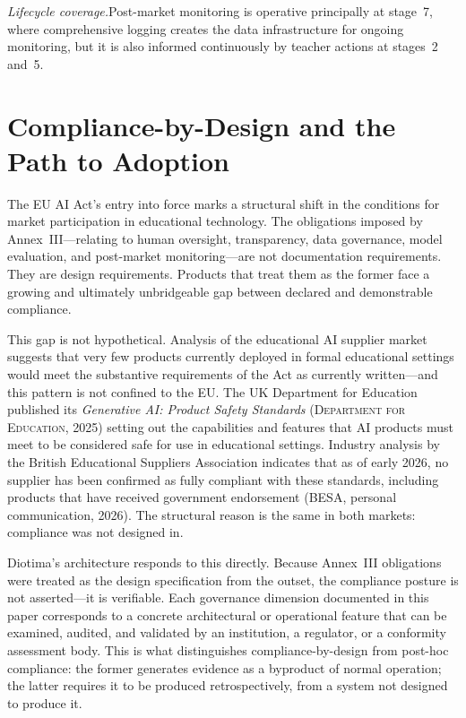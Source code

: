 \documentclass[10pt, a4paper, twocolumn]{article}
\begin{document}
\textit{Lifecycle coverage.}\quad Post-market monitoring is operative principally at
stage~7, where comprehensive logging creates the data infrastructure for ongoing
monitoring, but it is also informed continuously by teacher actions at stages~2 and~5.

\section{Compliance-by-Design and the Path to Adoption}

The EU AI Act's entry into force marks a structural shift in the conditions for market
participation in educational technology. The obligations imposed by Annex~III---relating
to human oversight, transparency, data governance, model evaluation, and post-market
monitoring---are not documentation requirements. They are design requirements. Products
that treat them as the former face a growing and ultimately unbridgeable gap between
declared and demonstrable compliance.

This gap is not hypothetical. Analysis of the educational AI supplier market suggests
that very few products currently deployed in formal educational settings would meet the
substantive requirements of the Act as currently written---and this pattern is not
confined to the EU. The UK Department for Education published its \textit{Generative AI:
Product Safety Standards} (\textsc{Department for Education}, 2025) setting out the
capabilities and features that AI products must meet to be considered safe for use in
educational settings. Industry analysis by the British Educational Suppliers Association
indicates that as of early 2026, no supplier has been confirmed as fully compliant with
these standards, including products that have received government endorsement (BESA,
personal communication, 2026). The structural reason is the same in both markets:
compliance was not designed in.

Diotima's architecture responds to this directly. Because Annex~III obligations were
treated as the design specification from the outset, the compliance posture is not
asserted---it is verifiable. Each governance dimension documented in this paper
corresponds to a concrete architectural or operational feature that can be examined,
audited, and validated by an institution, a regulator, or a conformity assessment body.
This is what distinguishes compliance-by-design from post-hoc compliance: the former
generates evidence as a byproduct of normal operation; the latter requires it to be
produced retrospectively, from a system not designed to produce it.
\end{document}
